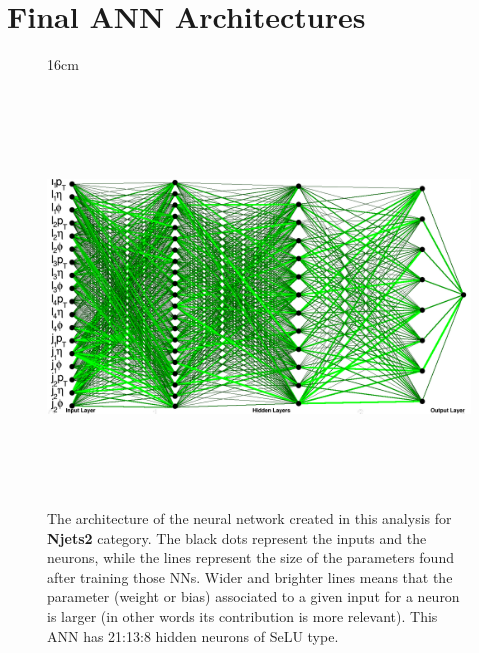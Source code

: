 \chapter{Final ANN Architectures}
\label{app:nns_architecture}

\begin{figure}[H!]{16cm}
	\vspace{-20cm}
	\caption{The architecture of the neural network created in this analysis for \textbf{Njets2} category. The black dots represent the inputs and the neurons, while the lines represent the size of the parameters found after training those NNs. Wider and brighter lines means that the parameter (weight or bias) associated to a given input for a neuron is larger (in other words its contribution is more relevant). This ANN has 21:13:8 hidden neurons of SeLU type.}
	\includegraphics[width=18cm,height=11cm,angle=90]{ChapterAnalysis/figs/k57nj2_architecture_horizontal}
\end{figure}
	

